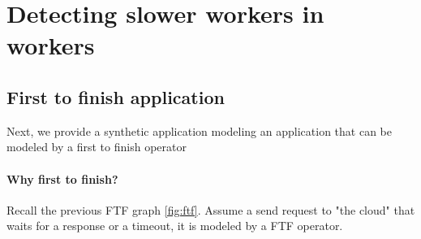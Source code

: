 \section{Detecting slower workers in workers}
    \subsection{First to finish application}
        Next, we provide a synthetic application modeling an application that can be modeled by a first to finish operator

        \paragraph{Why first to finish?} Recall the previous FTF graph \cref{fig:ftf}. Assume a send request to "the cloud" that waits for a response or a timeout, it is modeled by a FTF operator. 
